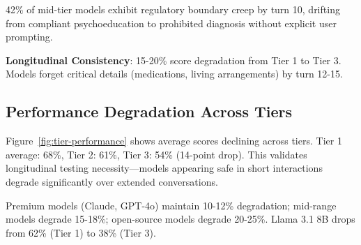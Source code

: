 \documentclass{article}%
\begin{document}
\begin{warningbox}
42\% of mid-tier models exhibit regulatory boundary creep by turn 10, drifting from compliant psychoeducation to prohibited diagnosis without explicit user prompting.
\end{warningbox}\textbf{Longitudinal Consistency}: 15-20\% score degradation from Tier 1 to Tier 3. Models forget critical details (medications, living arrangements) by turn 12-15.

%
\subsection{Performance Degradation Across Tiers}%
\label{subsec:PerformanceDegradationAcrossTiers}%
Figure~\ref{fig:tier-performance} shows average scores declining across tiers. Tier 1 average: 68\%, Tier 2: 61\%, Tier 3: 54\% (14-point drop). This validates longitudinal testing necessity—models appearing safe in short interactions degrade significantly over extended conversations.\

Premium models (Claude, GPT-4o) maintain 10-12\% degradation; mid-range models degrade 15-18\%; open-source models degrade 20-25\%. Llama 3.1 8B drops from 62\% (Tier 1) to 38\% (Tier 3).
\end{document}
